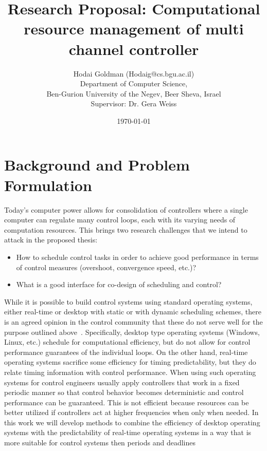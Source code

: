 \documentclass[11pt]{article}
\author{Hodai Goldman (Hodaig@cs.bgu.ac.il) \\
Department of Computer Science, \\
Ben-Gurion University of the Negev, Beer Sheva, Israel \\
Supervisor: Dr. Gera Weiss}
\date{\today}
\title{Research Proposal: Computational resource management of multi channel controller}
\begin{document}
\begin{titlepage}
\maketitle
\end{titlepage}




\section{Background and Problem Formulation}
\label{sec:Background}
Today's computer power allows for consolidation of controllers where a single computer can regulate many control loops, each with its varying needs of computation resources.
This brings two research challenges that we intend to attack in the proposed thesis:
\begin{itemize}
	\item How to schedule control tasks in order to achieve good performance in terms of control measures (overshoot, convergence speed, etc.)?
	\item What is a good interface for co-design of scheduling and control?
\end{itemize}

While it is possible to build control systems using standard operating systems, either real-time or desktop with static or with dynamic scheduling schemes, there is an agreed opinion in the control community that these do not serve well for the purpose outlined above~\cite{??}. Specifically, desktop type operating systems (Windows, Linux, etc.) schedule for computational efficiency, but do not allow for control performance guarantees of the individual loops. On the other hand, real-time operating systems sacrifice some efficiency for timing predictability, but they do relate timing information with control performance. When using such operating systems for control engineers usually apply controllers that work in a fixed periodic manner so that control behavior becomes deterministic and control performance can be guaranteed. This is not efficient because resources can be better utilized if controllers act at higher frequencies when only when needed. 
In this work we will develop methods to combine the efficiency of desktop operating systems with the predictability of real-time operating systems in a way that is more suitable for control systems then periods and deadlines
\end{document}
